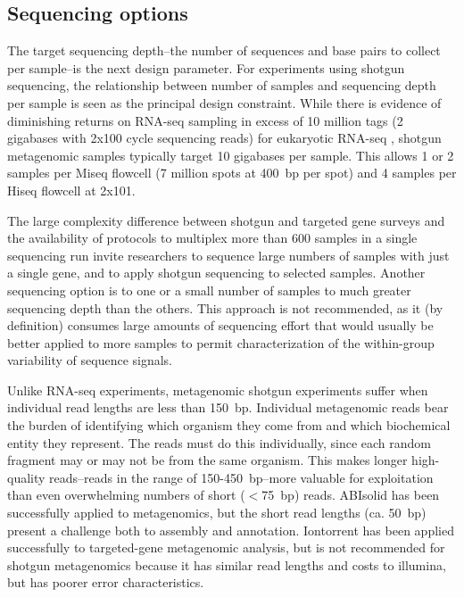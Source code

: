 \documentclass[graybox]{svmult}
\begin{document}
\subsection{Sequencing options }
\label{sec:2}
%

The target sequencing depth--the number of sequences and base pairs to collect per sample--is the next design parameter.  For experiments using shotgun sequencing, the relationship between number of samples and sequencing depth per sample is seen as the principal design constraint. \cite{Auer2010Statistical}    While there is evidence of diminishing returns on RNA-seq sampling in excess of 10 million tags (2 gigabases with 2x100 cycle sequencing reads) for eukaryotic RNA-seq \cite{Wang2011Evaluation}, shotgun metagenomic samples typically target 10 gigabases per sample.     This allows 1 or 2 samples per Miseq flowcell  (7 million spots at 400~bp per spot) and 4 samples per Hiseq flowcell at 2x101.

The large complexity difference between shotgun and targeted gene surveys and the availability of protocols to multiplex more than 600 samples in a single sequencing run invite researchers to sequence large numbers of samples with just a single gene, and to apply shotgun sequencing to selected samples.   Another sequencing option is to one or a small number of samples to much greater sequencing depth than the others.  This approach is not recommended, as it (by definition) consumes large amounts of sequencing effort that would usually be better applied to more samples to permit characterization of the within-group variability of sequence signals.

Unlike RNA-seq experiments, metagenomic shotgun experiments suffer when individual read lengths are less than 150~bp.  Individual metagenomic reads bear the burden of identifying which organism they come from and which biochemical entity they represent.  The reads must do this individually, since each random fragment may or may not be from the same organism.  This makes longer high-quality reads--reads in the range of 150-450~bp--more valuable for exploitation than even overwhelming numbers of short ($<$75~bp) reads.   
ABIsolid has been successfully applied to metagenomics\cite{Iverson2012Untangling}, but the short read lengths (ca. 50~bp) present a challenge both to assembly and annotation.
Iontorrent has been applied successfully to targeted-gene metagenomic analysis, but is not recommended for shotgun metagenomics because it has similar read lengths and costs to illumina, but has poorer error characteristics.
\end{document}
